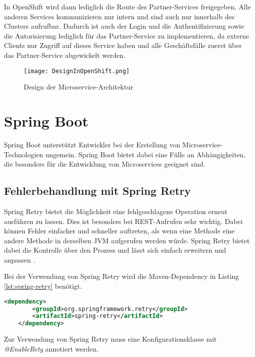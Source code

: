 In OpenShift wird dann lediglich die Route des Partner-Services freigegeben. Alle anderen Services kommunizieren nur intern und sind auch nur innerhalb des Clusters aufrufbar. Dadurch ist auch der Login und die Authentifizierung sowie die Autorisierung lediglich für das Partner-Service zu implementieren, da externe Clients nur Zugriff auf dieses Service haben und alle Geschäftsfälle zuerst über das Partner-Service abgewickelt werden.

\begin{figure}[H]
	\begin{center}
		\texttt{[image: DesignInOpenShift.png]}
		\caption[Design der Microservice-Architektur]{Design der Microservice-Architektur}
		\label{fig:DesignOfMicroserviceArchitecture}
	\end{center}
\end{figure}

\section{Spring Boot}
Spring Boot unterstützt Entwickler bei der Erstellung von Microservice-Technologien ungemein. Spring Boot bietet dabei eine Fülle an Abhängigkeiten, die besonders für die Entwicklung von Microservices geeignet sind.

\subsection{Fehlerbehandlung mit Spring Retry}
Spring Retry bietet die Möglichkeit eine fehlgeschlagene Operation erneut ausführen zu lassen. Dies ist besonders bei REST-Aufrufen sehr wichtig. Dabei können Fehler einfacher und schneller auftreten, als wenn eine Methode eine andere Methode in derselben JVM aufgerufen werden würde. Spring Retry bietet dabei die Kontrolle über den Prozess und lässt sich einfach erweitern und anpassen \cite{SpringBootOnline}.

Bei der Verwendung von Spring Retry wird die Maven-Dependency in Listing \ref{lst:spring-retry} benötigt.
\begin{lstlisting}[language=xml, caption=pom.xml, label=lst:spring-retry]
	<dependency>
		<groupId>org.springframework.retry</groupId>
		<artifactId>spring-retry</artifactId>
	</dependency>
\end{lstlisting}

Zur Verwendung von Spring Retry muss eine Konfigurationsklasse mit \textit{@EnableRety} annotiert werden.

